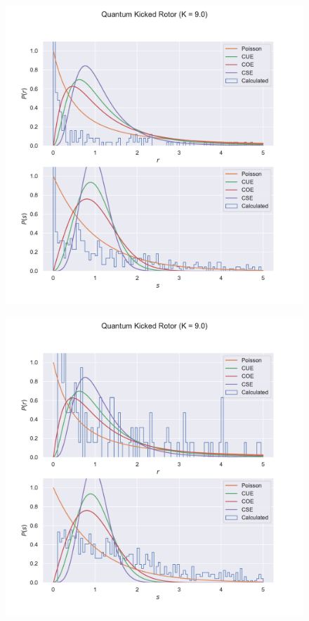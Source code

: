 \documentclass[12pt]{article}
\begin{document}
\begin{figure}
    \centering
    \includegraphics[width=\linewidth]{kickedrotor_spectrum_K9.0_magnified.pdf}
\end{figure}
\begin{figure}
    \centering
    \includegraphics[width=\linewidth]{kickedrotor_spectrum_K9.0_magnified_suppressed.pdf}
\end{figure}
\end{document}
